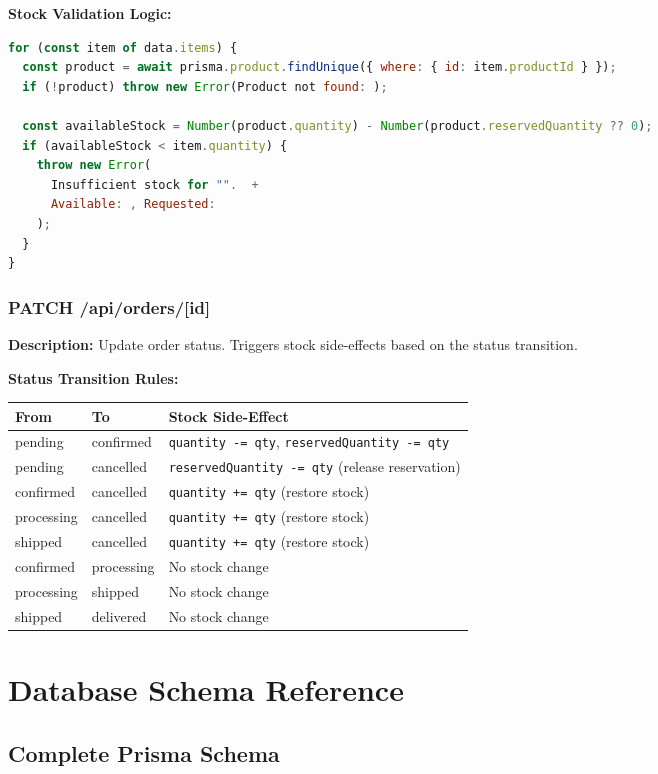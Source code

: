 \documentclass[12pt,a4paper]{report}
\begin{document}
\textbf{Stock Validation Logic:}
\begin{lstlisting}[language=JavaScript,caption={Stock validation before order creation}]
for (const item of data.items) {
  const product = await prisma.product.findUnique({ where: { id: item.productId } });
  if (!product) throw new Error(Product not found: );
  
  const availableStock = Number(product.quantity) - Number(product.reservedQuantity ?? 0);
  if (availableStock < item.quantity) {
    throw new Error(
      Insufficient stock for "".  +
      Available: , Requested: 
    );
  }
}
\end{lstlisting}

\subsection{PATCH /api/orders/[id]}

\textbf{Description:} Update order status. Triggers stock side-effects based on the status transition.

\textbf{Status Transition Rules:}
\begin{center}
\begin{tabularx}{\textwidth}{llX}
  \toprule
  \textbf{From} & \textbf{To} & \textbf{Stock Side-Effect} \\
  \midrule
  pending    & confirmed   & \texttt{quantity -= qty}, \texttt{reservedQuantity -= qty} \\
  pending    & cancelled   & \texttt{reservedQuantity -= qty} (release reservation) \\
  confirmed  & cancelled   & \texttt{quantity += qty} (restore stock) \\
  processing & cancelled   & \texttt{quantity += qty} (restore stock) \\
  shipped    & cancelled   & \texttt{quantity += qty} (restore stock) \\
  confirmed  & processing  & No stock change \\
  processing & shipped     & No stock change \\
  shipped    & delivered   & No stock change \\
  \bottomrule
\end{tabularx}
\end{center}

\chapter{Database Schema Reference}
\section{Complete Prisma Schema}
\end{document}
